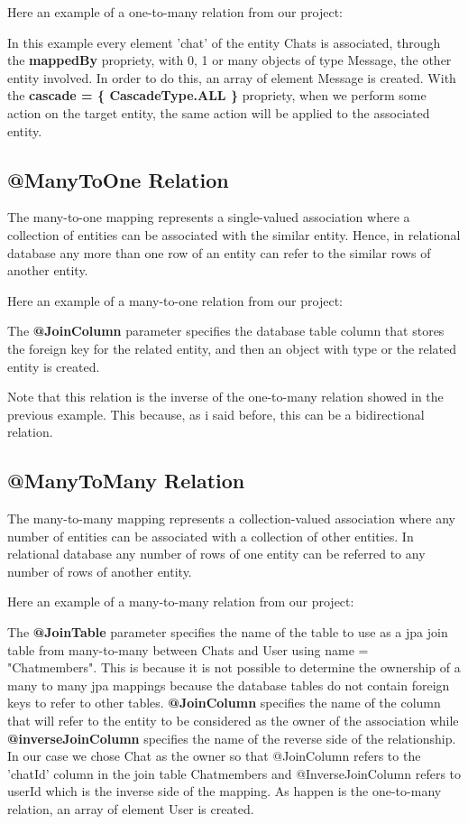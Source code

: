 \documentclass[a4paper]{article}
\begin{document}
Here an example of a one-to-many relation from our project:

In this example every element 'chat' of the entity Chats is associated, through the \textbf{mappedBy} propriety, with 0, 1 or many objects of type Message, the other entity involved. In order to do this, an array of element Message is created. With the \textbf{cascade = \{ CascadeType.ALL \}} propriety, when we perform some action on the target entity, the same action will be applied to the associated entity.

\subsection{@ManyToOne Relation}
The many-to-one mapping represents a single-valued association where a collection of entities can be associated with the similar entity. Hence, in relational database any more than one row of an entity can refer to the similar rows of another entity.

Here an example of a many-to-one relation from our project:

The \textbf{@JoinColumn} parameter specifies the database table column that stores the foreign key for the related entity, and then an object with type or the related entity is created.

Note that this relation is the inverse of the one-to-many relation showed in the previous example. This because, as i said before, this can be a bidirectional relation. 

\subsection{@ManyToMany Relation}
The many-to-many mapping represents a collection-valued association where any number of entities can be associated with a collection of other entities. In relational database any number of rows of one entity can be referred to any number of rows of another entity.

Here an example of a many-to-many relation from our project:

The \textbf{@JoinTable} parameter specifies the name of the table to use as a jpa join table from many-to-many between Chats and User using name = "Chatmembers". This is because it is not possible to determine the ownership of a many to many jpa mappings because the database tables do not contain foreign keys to refer to other tables. \textbf{@JoinColumn} specifies the name of the column that will refer to the entity to be considered as the owner of the association while \textbf{@inverseJoinColumn} specifies the name of the reverse side of the relationship. In our case we chose Chat as the owner so that @JoinColumn refers to the 'chatId' column in the join table Chatmembers and @InverseJoinColumn refers to userId which is the inverse side of the mapping. As happen is the one-to-many relation, an array of element User is created.
\end{document}
